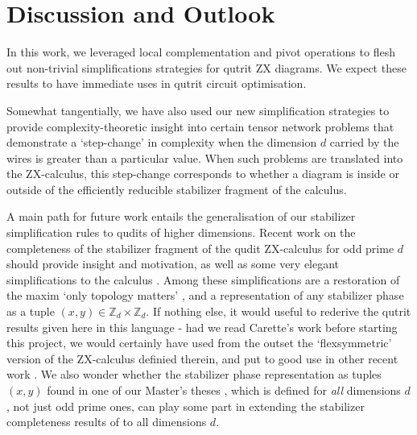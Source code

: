 \section{Discussion and Outlook}

In this work, we leveraged local complementation and pivot operations to flesh out non-trivial simplifications strategies for qutrit ZX diagrams. We expect these results to have immediate uses in qutrit circuit optimisation. 

Somewhat tangentially, we have also used our new simplification strategies to provide complexity-theoretic insight into certain tensor network problems that demonstrate a `step-change' in complexity when the dimension $d$ carried by the wires is greater than a particular value. When such problems are translated into the ZX-calculus, this step-change corresponds to whether a diagram is inside or outside of the efficiently reducible stabilizer fragment of the calculus.



A main path for future work entails the generalisation
of our stabilizer simplification rules to qudits of higher dimensions. Recent work on the completeness of the stabilizer fragment of the qudit ZX-calculus for odd prime $d$ should provide insight and motivation, as well as some very elegant simplifications to the calculus \cite{Booth_2022}. Among these simplifications are a restoration of the maxim `only topology matters' \cite{Carette_2021}, and a representation of any stabilizer phase as a tuple $(x, y) \in \mathbb{Z}_d \times \mathbb{Z}_d$. If nothing else, it would useful to rederive the qutrit results given here in this language - had we read Carette's work \cite{Carette_2021} before starting this project, we would certainly have used from the outset the `flexsymmetric' version of the ZX-calculus definied therein, and put to good use in other recent work \cite{van_de_Wetering_2022}. 
We also wonder whether the stabilizer phase representation as tuples $(x, y)$ found in one of our Master's theses \cite[Theorem 5.2]{TeagueMasters}, which is defined for \emph{all} dimensions $d$, not just odd prime ones, can play some part in extending the stabilizer completeness results of \cite{Booth_2022} to all dimensions $d$.


